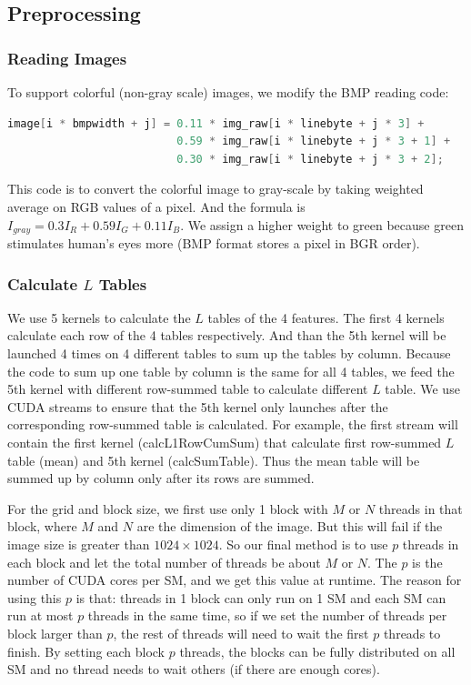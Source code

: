 \documentclass[12pt, a4paper]{article}
\begin{document}
  \subsection{Preprocessing}\label{preprocessing}
    \subsubsection{Reading Images}\label{reading-image}
      To support colorful (non-gray scale) images, we modify the BMP reading
      code:
      \begin{lstlisting}[language=c]
image[i * bmpwidth + j] = 0.11 * img_raw[i * linebyte + j * 3] +
                          0.59 * img_raw[i * linebyte + j * 3 + 1] +
                          0.30 * img_raw[i * linebyte + j * 3 + 2];
      \end{lstlisting}
      This code is to convert the colorful image to gray-scale by taking weighted
      average on RGB values of a pixel. And the formula is
      $I_{gray}=0.3I_R+0.59I_G+0.11I_B$. We assign a higher weight to green because
      green stimulates human's eyes more (BMP format stores a pixel in BGR order).
    \subsubsection{Calculate $L$ Tables}
      We use 5 kernels to calculate the $L$ tables of the 4 features. The first
      4 kernels calculate each row of the 4 tables respectively. And than the
      5th kernel will be launched 4 times on 4 different tables to sum up the
      tables by column. Because the code to sum up one table by column is the
      same for all 4 tables, we feed the 5th kernel with different row-summed
      table to calculate different $L$ table.
      We use CUDA streams to ensure that the 5th kernel only
      launches after the corresponding row-summed table is calculated. For example,
      the first stream will contain the first kernel (calcL1RowCumSum) that
      calculate first row-summed $L$ table (mean) and 5th kernel (calcSumTable).
      Thus the mean table will be summed up by column only after its rows are summed.

      For the grid and block size, we first use only 1 block with $M$ or $N$ threads
      in that block, where $M$ and $N$ are the dimension of the image. But this
      will fail if the image size is greater than $1024\times1024$. So our final
      method is to use $p$ threads in each block and let the total number of
      threads be about $M$ or $N$. The $p$ is the number of CUDA cores per SM,
      and we get this value at runtime. The reason for using this $p$ is that:
      threads in 1 block can only run on 1 SM and each SM can run at most $p$
      threads in the same time, so if we set the number of threads per block larger
      than $p$, the rest of threads will need to wait the first $p$ threads to
      finish. By setting each block $p$ threads, the blocks can be fully distributed
      on all SM and no thread needs to wait others (if there are enough cores).
\end{document}
